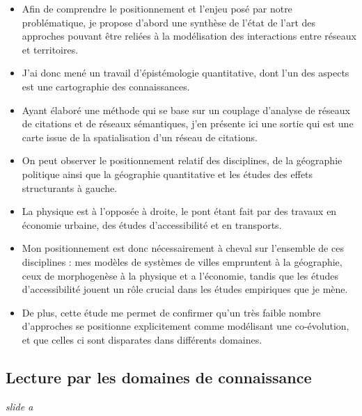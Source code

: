 \documentclass[12pt]{article}
\begin{document}
\begin{itemize}
	\item Afin de comprendre le positionnement et l'enjeu posé par notre problématique, je propose d'abord une synthèse de l'état de l'art des approches pouvant être reliées à la modélisation des interactions entre réseaux et territoires.
	\item J'ai donc mené un travail d'épistémologie quantitative, dont l'un des aspects est une cartographie des connaissances.
	\item Ayant élaboré une méthode qui se base sur un couplage d'analyse de réseaux de citations et de réseaux sémantiques, j'en présente ici une sortie qui est une carte issue de la spatialisation d'un réseau de citations.
	\item On peut observer le positionnement relatif des disciplines, de la géographie politique ainsi que la géographie quantitative et les études des effets structurants à gauche.
	\item La physique est à l'opposée à droite, le pont étant fait par des travaux en économie urbaine, des études d'accessibilité et en transports.
	\item Mon positionnement est donc nécessairement à cheval sur l'ensemble de ces disciplines : mes modèles de systèmes de villes empruntent à la géographie, ceux de morphogenèse à la physique et a l'économie, tandis que les études d'accessibilité jouent un rôle crucial dans les études empiriques que je mène.
	\item De plus, cette étude me permet de confirmer qu'un très faible nombre d'approches se positionne explicitement comme modélisant une co-évolution, et que celles ci sont disparates dans différents domaines.
\end{itemize}



\newpage


\subsection*{Lecture par les domaines de connaissance}

\textit{slide a}
\end{document}
